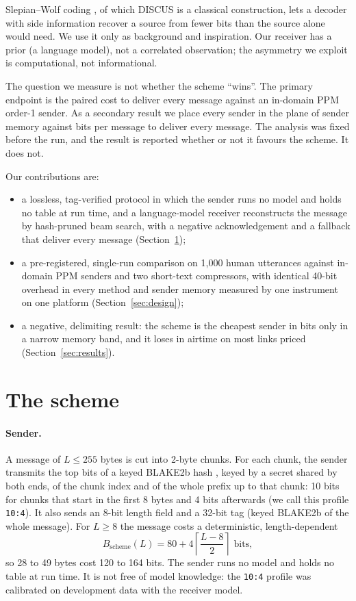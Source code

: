 \documentclass[11pt]{article}
\begin{document}
Slepian--Wolf coding \cite{slepian1973}, of which DISCUS \cite{pradhan2003discus} is a classical
construction, lets a decoder with side information recover a source from fewer bits than the source
alone would need. We use it only as background and inspiration. Our receiver has a prior (a language
model), not a correlated observation; the asymmetry we exploit is computational, not informational.

The question we measure is not whether the scheme ``wins''. The primary endpoint is the paired cost
to deliver every message against an in-domain PPM order-1 sender. As a secondary result we place every
sender in the plane of sender memory against bits per message to deliver every message. The analysis
was fixed before the run, and the result is reported whether or not it favours the scheme. It does
not.

Our contributions are:
\begin{itemize}
\item a lossless, tag-verified protocol in which the sender runs no model and holds no table at run
time, and a language-model receiver reconstructs the message by hash-pruned beam search, with a
negative acknowledgement and a fallback that deliver every message (Section~\ref{sec:scheme});
\item a pre-registered, single-run comparison on 1,000 human utterances against in-domain PPM
senders and two short-text compressors, with identical 40-bit overhead in every method and sender
memory measured by one instrument on one platform (Section~\ref{sec:design});
\item a negative, delimiting result: the scheme is the cheapest sender in bits only in a narrow
memory band, and it loses in airtime on most links priced (Section~\ref{sec:results}).
\end{itemize}

\section{The scheme}\label{sec:scheme}

\paragraph{Sender.} A message of $L \le 255$ bytes is cut into 2-byte chunks. For each chunk, the
sender transmits the top bits of a keyed BLAKE2b hash \cite{aumasson2013blake2}, keyed by a secret
shared by both ends, of the chunk index and of the whole prefix up to that chunk: 10 bits for chunks
that start in the first 8 bytes and 4 bits afterwards (we call this profile \texttt{10:4}). It also
sends an 8-bit length field and a 32-bit tag (keyed BLAKE2b of the whole message). For $L \ge 8$ the
message costs a deterministic, length-dependent
\begin{equation}
B_{\mathrm{scheme}}(L) = 80 + 4\left\lceil \frac{L-8}{2} \right\rceil \text{ bits},
\end{equation}
so 28 to 49 bytes cost 120 to 164 bits. The sender runs no model and holds no table at run time. It
is not free of model knowledge: the \texttt{10:4} profile was calibrated on development data with
the receiver model.
\end{document}
